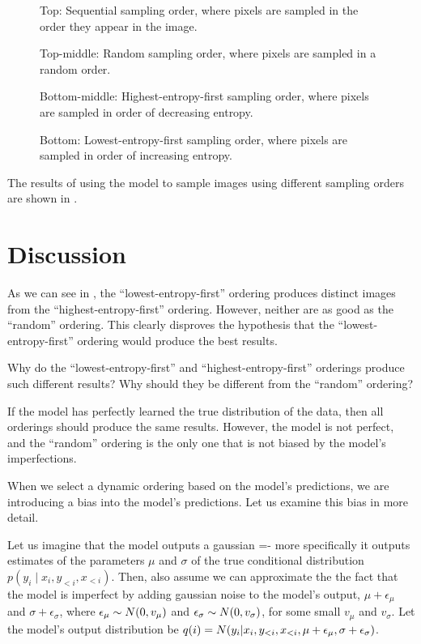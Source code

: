 \begin{figure}
{    Top: Sequential sampling order, where pixels are sampled in the order they appear in the image.

    Top-middle: Random sampling order, where pixels are sampled in a random order.

    Bottom-middle: Highest-entropy-first sampling order, where pixels are sampled in order of decreasing entropy.

    Bottom: Lowest-entropy-first sampling order, where pixels are sampled in order of increasing entropy.}
    \label{fig:order-comparison}
\end{figure}

The results of using the model to sample images using different sampling orders are shown in .

\section{Discussion}
\label{s:a-o-discussion}

As we can see in , the ``lowest-entropy-first'' ordering produces distinct images from the ``highest-entropy-first'' ordering. However, neither are as good as the ``random'' ordering. This clearly disproves the hypothesis that the ``lowest-entropy-first'' ordering would produce the best results.

Why do the ``lowest-entropy-first'' and ``highest-entropy-first'' orderings produce such different results? Why should they be different from the ``random'' ordering?

If the model has perfectly learned the true distribution of the data, then all orderings should produce the same results. However, the model is not perfect, and the ``random'' ordering is the only one that is not biased by the model's imperfections.

When we select a dynamic ordering based on the model's predictions, we are introducing a bias into the model's predictions. Let us examine this bias in more detail.

Let us imagine that the model outputs a gaussian =- more specifically it outputs estimates of the parameters $\mu$ and $\sigma$ of the true conditional distribution $p(y_i \mid x_i, y_{<i}, x_{<i})$. Then, also assume we can approximate the the fact that the model is imperfect by adding gaussian noise to the model's output, $\mu + \epsilon_\mu$ and $\sigma + \epsilon_\sigma$, where $\epsilon_\mu \sim \relax{N}(0, v_\mu)$ and $\epsilon_\sigma \sim \relax{N}(0, v_\sigma)$, for some small $v_\mu$ and $v_\sigma$. Let the model's output distribution be $q(i) = \relax{N}(y_i | x_i, y_{<i}, x_{<i}, \mu + \epsilon_\mu, \sigma + \epsilon_\sigma)$.

